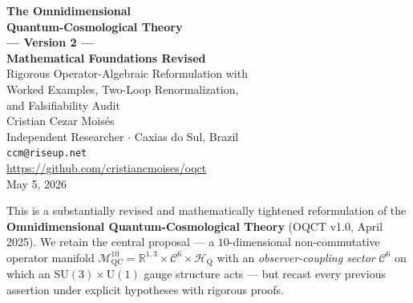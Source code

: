 \documentclass[11pt,a4paper]{article}
\theoremstyle{myrmk}
\newcommand{\Mmanifold}{\mathcal{M}^{10}_{\mathrm{QC}}}
\newcommand{\cC}{\mathcal{C}^{6}}
\newcommand{\HH}{\mathcal{H}_{\mathrm{Q}}}
\begin{document}
\begin{titlepage}
\centering\vspace*{1.4cm}
{\Huge\bfseries\color{deepblue}
  The Omnidimensional\\[4pt]
  Quantum-Cosmological Theory\\[6pt]
  \large\color{cosmicpurple}--- Version 2 ---\\[4pt]
  \LARGE\color{deepblue} Mathematical Foundations Revised\\[1.6em]}
{\large\color{cosmicpurple}
  Rigorous Operator-Algebraic Reformulation with\\
  Worked Examples, Two-Loop Renormalization,\\
  and Falsifiability Audit\\[1.8em]}
{\large Cristian Cezar Mois\'{e}s}\\[0.3em]
{\normalsize Independent Researcher $\cdot$ Caxias do Sul, Brazil}\\[0.3em]
{\small \texttt{ccm@riseup.net}}\\[0.2em]
{\small \url{https://github.com/cristiancmoises/oqct}}\\[1.6em]
{\normalsize May 5, 2026}\\[2.2em]

\begin{tcolorbox}[colback=lightgray,colframe=deepblue,width=0.96\textwidth,
  title={\color{white}\bfseries Abstract},
  attach boxed title to top left={yshift=-2mm,xshift=4mm},
  boxed title style={colback=deepblue,colframe=deepblue}]
\small
This is a substantially revised and mathematically tightened reformulation of the
\textbf{Omnidimensional Quantum-Cosmological Theory} (OQCT v1.0, April 2025).
We retain the central proposal --- a $10$-dimensional non-commutative operator
manifold $\Mmanifold = \mathbb{R}^{1,3}\times\cC\times\HH$ with an
\emph{observer-coupling sector} $\cC$ on which an $\mathrm{SU}(3)\times\mathrm{U}(1)$
gauge structure acts --- but recast every previous assertion under explicit hypotheses
with rigorous proofs.


\end{tcolorbox}
\end{titlepage}
\end{document}
